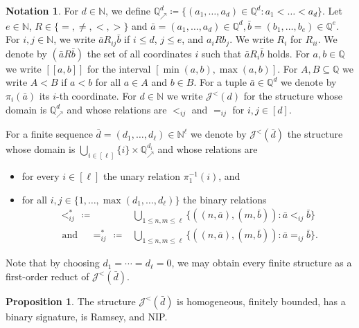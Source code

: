\documentclass{amsart}
\theoremstyle{definition}
\newtheorem{notation}[theorem]{Notation}
\newtheorem{proposition}[theorem]{Proposition}
\theoremstyle{remark}
\numberwithin{equation}{section}
\newcommand\johnord[1]{\mathcal{J}^{<}(#1)}
\newcommand\qup[1]{\mathbb{Q}_\nearrow^{#1}}
\newcommand\qdown[1]{\mathbb{Q}_\searrow^{#1}}
\begin{document}
\begin{notation}\label{not:qup}
	{For $d \in {\mathbb N}$,}  we define $\qup{d}\coloneqq \{(a_1,\dots,a_d)\in \mathbb{Q}^d: a_1<\dots<a_d\}$. 
	Let {$e \in {\mathbb N}$,} $R\in \{=,\neq,<,>\}$ and $\bar{a}=(a_1,\dots,a_d){\in \mathbb{Q}^d},\bar{b}=(b_1,\dots,b_e)\in \mathbb{Q}^e$. For $i,j \in \mathbb{N}$, we write $\bar{a}R_{ij}\bar{b}$ if $i\leq d$, $j\leq e$, and $a_i R b_j$. We write $R_i$ for $R_{ii}$. We denote by $(\bar{a}R\bar{b})$ the set of all coordinates $i$ such that $\bar{a}R_i\bar{b}$ holds.
	For $a,b\in \mathbb{Q}$ we write $[[a,b]]$ for the interval $[\min(a,b), \max(a,b)]$.
	For $A,B\subseteq \mathbb{Q}$ we write $A<B$ if $a<b$ for all $a\in A$ and $b\in B$.
	For a tuple $\bar{a} \in {\mathbb Q}^d$ we denote by $\pi_i(\bar{a})$ its $i$-th coordinate.
    For $d\in \mathbb{N}$ we write $\johnord{d}$ for the structure whose domain is $\qup{d}$ and whose relations are $<_{ij}$ and $=_{ij}$ for $i,j\in [d]$.
    	 
	For a finite sequence $\bar{d}=(d_1,\dots,d_{\ell})\in {\mathbb N}^{\ell}$ 
    we denote by $\johnord{\bar{d}}$ the structure whose domain is $\bigcup_{i\in [\ell]}{\{i\}\times \qup{d_i}}$ and whose relations are  
    \begin{itemize}
        \item for every $i\in [\ell]$ the unary relation $\pi_1^{-1}(i)$, and 
        \item for all $i,j\in \{1,\dots,\max(d_1,\dots,d_{\ell})\}$ the binary relations 
\begin{align*}
<^*_{ij}\, \coloneqq& \bigcup_{1\leq n,m\leq \ell}\{((n,\bar{a}),(m,\bar{b})): \bar{a}<_{ij}\bar{b}\} \\
\text{ and } \quad =^*_{ij}\, \coloneqq& \bigcup_{1\leq n,m\leq \ell}\{((n,\bar{a}),(m,\bar{b})): \bar{a}=_{ij}\bar{b}\}.
\end{align*}
    \end{itemize}
\end{notation}
{Note that by choosing $d_1=\cdots=d_{\ell}=0$, we may obtain every finite structure as a first-order reduct of $\johnord{\bar{d}}$.}

\begin{proposition}\label{johnhom}
	The structure $\johnord{\bar{d}}$ is homogeneous, finitely bounded, has a binary signature, is Ramsey, and NIP.
\end{proposition}
\end{document}
